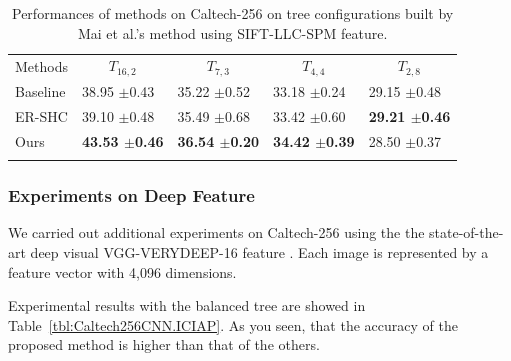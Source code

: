 \documentclass[review]{elsarticle}
\begin{document}



\begin{table}
\caption{Performances of methods on Caltech-256 on tree configurations built by Mai et al.'s method \cite{MaiICIAP15} using SIFT-LLC-SPM feature.}  
\label{tbl:Caltech256SIFT.ICIAP} 
\centering
\begin{tabular}{lllll}
\hline\noalign{\smallskip}
Methods  & \multicolumn{1}{c}{$T_{16,2}$} & \multicolumn{1}{c}{$T_{7,3}$} & \multicolumn{1}{c}{$T_{4,4}$} &		\multicolumn{1}{c}{$T_{2,8}$}  \\
\noalign{\smallskip}\hline\hline\noalign{\smallskip}

Baseline \cite{MaiICIAP15} 	 &  38.95  $\pm$0.43  & 35.22 $\pm$0.52 & 33.18 $\pm$0.24 & 29.15 $\pm$0.48 \\

ER-SHC \cite{Zhu.CVIU2014} 	 &  39.10  $\pm$0.48  & 35.49 $\pm$0.68 & 33.42 $\pm$0.60 & \textbf{29.21 $\pm$0.46} \\
			
Ours             &    \textbf{43.53 $\pm$0.46}  & \textbf{36.54 $\pm$0.20} & \textbf{34.42 $\pm$0.39}  & 28.50 $\pm$0.37 \\
			
\noalign{\smallskip}\hline\noalign{\smallskip}
\end{tabular}
\end{table}

\subsubsection{Experiments on Deep Feature}

We carried out additional experiments on Caltech-256 using the the state-of-the-art deep visual VGG-VERYDEEP-16 feature \cite{ChatfieldBMVC14}. Each image is represented by a feature vector with 4,096 dimensions.

Experimental results with the balanced tree \cite{MaiICIAP15} are showed in Table~\ref{tbl:Caltech256CNN.ICIAP}. As you seen, that the accuracy of the proposed method is higher than that of the others. 
\end{document}
